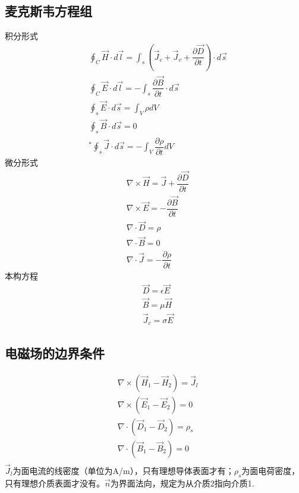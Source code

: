 \documentclass{ctexart}
\begin{document}
\subsection{麦克斯韦方程组}
积分形式
\begin{align}
    &\oint _C \vec{H}\cdot d\vec{l}=\int_{s}(\vec{J}_c+\vec{J}_v+\dfrac{\partial \vec{D}}{\partial t})\cdot d\vec{s}\\
    &\oint _C \vec{E}\cdot d\vec{l}=-\int_s \dfrac{\partial \vec{B}}{\partial t}\cdot d \vec{s}\\
    &\oint_s \vec{E}\cdot d\vec{s}=\int_V \rho dV\\
    &\oint_s\vec{B}\cdot d\vec{s}=0\\
    &^* \oint_s \vec{J}\cdot d \vec{s}=-\int_V\dfrac{\partial \rho}{\partial t}dV
\end{align}
微分形式
\begin{align}
    &\nabla \times \vec{H}=\vec{J}+\dfrac{\partial \vec{D}}{\partial t}\\
    &\nabla \times \vec{E}=-\dfrac{\partial \vec{B}}{\partial t}\\
    &\nabla \cdot \vec{D}=\rho\\
    &\nabla \cdot \vec{B}=0\\
    &\nabla \cdot \vec{J}=-\dfrac{\partial \rho}{\partial t}
\end{align}
本构方程
\begin{align}
    &\vec{D}=\epsilon \vec{E}\\
    &\vec{B}=\mu \vec{H}\\
    &\vec{J}_c=\sigma \vec{E}
\end{align}
\subsection{电磁场的边界条件}
\begin{align}
    &\nabla \times (\vec{H}_1-\vec{H}_2)=\vec{J}_l\\
    &\nabla \times (\vec{E}_1-\vec{E}_2)=0\\
    &\nabla \cdot (\vec{D}_1-\vec{D}_2)=\rho_s\\
    &\nabla \cdot (\vec{B}_1-\vec{B}_2)=0\\
\end{align}
$\vec{J}_l$为面电流的线密度（单位为A/m），只有理想导体表面才有；$\rho_s$为面电荷密度，只有理想介质表面才没有。$\vec{n}$为界面法向，规定为从介质2指向介质1.
\end{document}
